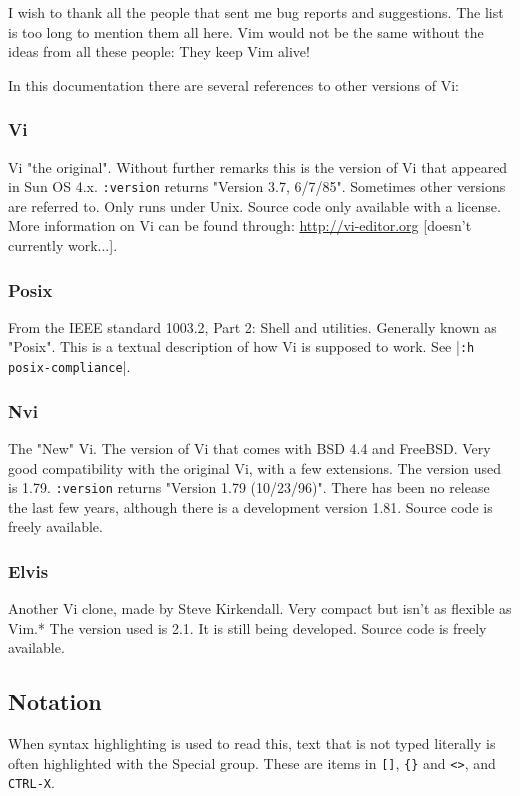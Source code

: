 I wish to thank all the people that sent me bug reports and suggestions.
The list is too long to mention them all here.
Vim would not be the same without the ideas from all these people: They keep Vim alive!

In this documentation there are several references to other versions of Vi:

\subsubsection{Vi}
\label{Vi}
\label{vi}
Vi "the original".
Without further remarks this is the version of Vi that appeared in Sun OS 4.x.
\verb!:version! returns "Version 3.7, 6/7/85".
Sometimes other versions are referred to.
Only runs under Unix.
Source code only available with a license.
More information on Vi can be found through: \url{http://vi-editor.org} [doesn't currently work...].

\subsubsection{Posix}
\label{Posix}
From the IEEE standard 1003.2, Part 2: Shell and utilities.
Generally known as "Posix".
This is a textual description of how Vi is supposed to work.
See |\verb!:h posix-compliance!|.

\subsubsection{Nvi}
\label{Nvi}
The "New" Vi.
The version of Vi that comes with BSD 4.4 and FreeBSD.
Very good compatibility with the original Vi, with a few extensions.
The version used is 1.79.
\verb!:version! returns "Version 1.79 (10/23/96)".
There has been no release the last few years, although there is a development version 1.81.
Source code is freely available.

\subsubsection{Elvis}
\label{Elvis}
Another Vi clone, made by Steve Kirkendall.
Very compact but isn't as flexible as Vim.*
The version used is 2.1.
It is still being developed.
Source code is freely available.

\subsection{Notation}
\label{notation}
When syntax highlighting is used to read this, text that is not typed literally is often highlighted with the Special group.
These are items in \verb![]!, \verb!{}! and \verb!<>!, and \verb!CTRL-X!.

